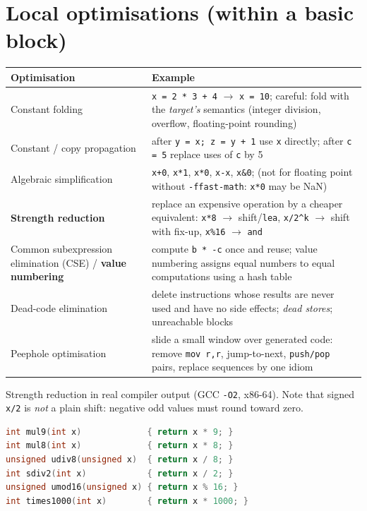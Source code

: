 \documentclass[10pt,a4paper,openany,oneside]{report}
\newcommand{\prio}[1]{\texorpdfstring{\ifcase#1\or{\color{gold}\ding{72}}\or{\color{gold}\ding{72}\ding{72}}\or{\color{gold}\ding{72}\ding{72}\ding{72}}\fi}{}}
\begin{document}
\section{Local optimisations (within a basic block) \prio{3}}
\begin{center}\small
\begin{xltabular}{\textwidth}{@{}L{3.9cm}Y@{}}
\toprule
\textbf{Optimisation} & \textbf{Example}\\
\midrule\endhead
Constant folding & \texttt{x = 2 * 3 + 4} $\to$ \texttt{x = 10}; careful: fold with the \emph{target's} semantics (integer division, overflow, floating-point rounding)\\
Constant / copy propagation & after \texttt{y = x; z = y + 1} use \texttt{x} directly; after \texttt{c = 5} replace uses of \texttt{c} by 5\\
Algebraic simplification & \texttt{x+0}, \texttt{x*1}, \texttt{x*0}, \texttt{x-x}, \texttt{x\&0}; (not for floating point without \texttt{-ffast-math}: \texttt{x*0} may be NaN)\\
\textbf{Strength reduction} & replace an expensive operation by a cheaper equivalent: \texttt{x*8} $\to$ shift/\texttt{lea}, \texttt{x/2\textasciicircum{}k} $\to$ shift with fix-up, \texttt{x\%16} $\to$ \texttt{and}\\
Common subexpression elimination (CSE) / \textbf{value numbering} & compute \texttt{b * -c} once and reuse; value numbering assigns equal numbers to equal computations using a hash table\\
Dead-code elimination & delete instructions whose results are never used and have no side effects; \emph{dead stores}; unreachable blocks\\
Peephole optimisation & slide a small window over generated code: remove \texttt{mov r,r}, jump-to-next, \texttt{push/pop} pairs, replace sequences by one idiom\\
\bottomrule
\end{xltabular}
\end{center}
Strength reduction in real compiler output (GCC \texttt{-O2}, x86-64). Note that signed \texttt{x/2} is \emph{not} a plain shift: negative odd values must round toward zero.
\begin{lstlisting}[language={C}]
int mul9(int x)             { return x * 9; }
int mul8(int x)             { return x * 8; }
unsigned udiv8(unsigned x)  { return x / 8; }
int sdiv2(int x)            { return x / 2; }
unsigned umod16(unsigned x) { return x % 16; }
int times1000(int x)        { return x * 1000; }
\end{lstlisting}
\end{document}
